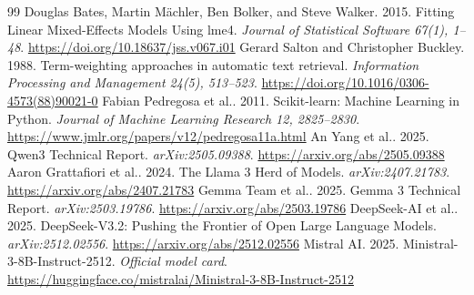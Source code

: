 \documentclass[sigconf,anonymous,review]{acmart}
\begin{document}
\begin{thebibliography}{99}
 Douglas Bates, Martin M\"achler, Ben Bolker, and Steve Walker. 2015. Fitting Linear Mixed-Effects Models Using lme4. \emph{Journal of Statistical Software 67(1), 1--48}. \url{https://doi.org/10.18637/jss.v067.i01}
 Gerard Salton and Christopher Buckley. 1988. Term-weighting approaches in automatic text retrieval. \emph{Information Processing and Management 24(5), 513--523}. \url{https://doi.org/10.1016/0306-4573(88)90021-0}
 Fabian Pedregosa et al.. 2011. Scikit-learn: Machine Learning in Python. \emph{Journal of Machine Learning Research 12, 2825--2830}. \url{https://www.jmlr.org/papers/v12/pedregosa11a.html}
 An Yang et al.. 2025. Qwen3 Technical Report. \emph{arXiv:2505.09388}. \url{https://arxiv.org/abs/2505.09388}
 Aaron Grattafiori et al.. 2024. The Llama 3 Herd of Models. \emph{arXiv:2407.21783}. \url{https://arxiv.org/abs/2407.21783}
 Gemma Team et al.. 2025. Gemma 3 Technical Report. \emph{arXiv:2503.19786}. \url{https://arxiv.org/abs/2503.19786}
 DeepSeek-AI et al.. 2025. DeepSeek-V3.2: Pushing the Frontier of Open Large Language Models. \emph{arXiv:2512.02556}. \url{https://arxiv.org/abs/2512.02556}
 Mistral AI. 2025. Ministral-3-8B-Instruct-2512. \emph{Official model card}. \url{https://huggingface.co/mistralai/Ministral-3-8B-Instruct-2512}
\end{thebibliography}
\end{document}
